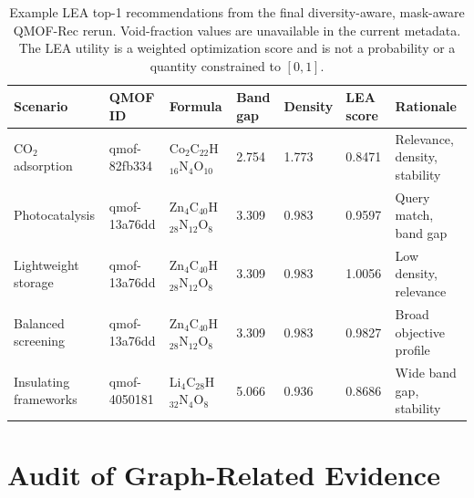 \documentclass[12pt,a4paper]{article}
\begin{document}
\begin{table}[H]
\centering
\caption{Example LEA top-1 recommendations from the final diversity-aware, mask-aware QMOF-Rec rerun. Void-fraction values are unavailable in the current metadata. The LEA utility is a weighted optimization score and is not a probability or a quantity constrained to $[0,1]$.}
\label{tab:examples}
\scriptsize
\setlength{\tabcolsep}{3pt}
\begin{tabular}{L{2.2cm} L{2.0cm} L{3.25cm} C{1.25cm} C{1.2cm} C{1.35cm} L{2.1cm}}
\toprule
\textbf{Scenario} & \textbf{QMOF ID} & \textbf{Formula} & \textbf{Band gap} & \textbf{Density} & \textbf{LEA score} & \textbf{Rationale}\\
\midrule
CO$_2$ adsorption  & qmof-82fb334 & Co$_2$C$_{22}$H$_{16}$N$_4$O$_{10}$ & 2.754 & 1.773 & 0.8471 & Relevance, density, stability\\
Photocatalysis     & qmof-13a76dd & Zn$_4$C$_{40}$H$_{28}$N$_{12}$O$_8$ & 3.309 & 0.983 & 0.9597 & Query match, band gap\\
Lightweight storage & qmof-13a76dd & Zn$_4$C$_{40}$H$_{28}$N$_{12}$O$_8$ & 3.309 & 0.983 & 1.0056 & Low density, relevance\\
Balanced screening  & qmof-13a76dd & Zn$_4$C$_{40}$H$_{28}$N$_{12}$O$_8$ & 3.309 & 0.983 & 0.9827 & Broad objective profile\\
Insulating frameworks & qmof-4050181 & Li$_4$C$_{28}$H$_{32}$N$_4$O$_8$ & 5.066 & 0.936 & 0.8686 & Wide band gap, stability\\
\bottomrule
\end{tabular}
\end{table}

\section{Audit of Graph-Related Evidence}
\label{sec:gnn}
\end{document}
